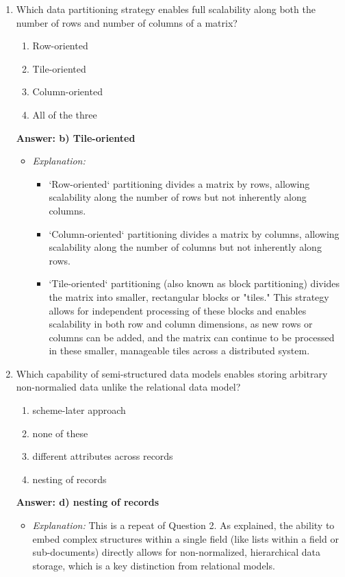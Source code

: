\documentclass{article}
\begin{document}
\begin{enumerate}[label=\textbf{Question \arabic*.}]
\item Which data partitioning strategy enables full scalability along both the number of rows and number of columns of a matrix?
    \begin{enumerate}[label=\alph*)]
        \item Row-oriented
        \item Tile-oriented
        \item Column-oriented
        \item All of the three
    \end{enumerate}
    \textbf{Answer: b) Tile-oriented}
    \begin{itemize}
        \item \textit{Explanation:}
        \begin{itemize}
            \item `Row-oriented` partitioning divides a matrix by rows, allowing scalability along the number of rows but not inherently along columns.
            \item `Column-oriented` partitioning divides a matrix by columns, allowing scalability along the number of columns but not inherently along rows.
            \item `Tile-oriented` partitioning (also known as block partitioning) divides the matrix into smaller, rectangular blocks or "tiles." This strategy allows for independent processing of these blocks and enables scalability in both row and column dimensions, as new rows or columns can be added, and the matrix can continue to be processed in these smaller, manageable tiles across a distributed system.
        \end{itemize}
    \end{itemize}

\item Which capability of semi-structured data models enables storing arbitrary non-normalied data unlike the relational data model?
    \begin{enumerate}[label=\alph*)]
        \item scheme-later approach
        \item none of these
        \item different attributes across records
        \item nesting of records
    \end{enumerate}
    \textbf{Answer: d) nesting of records}
    \begin{itemize}
        \item \textit{Explanation:} This is a repeat of Question 2. As explained, the ability to embed complex structures within a single field (like lists within a field or sub-documents) directly allows for non-normalized, hierarchical data storage, which is a key distinction from relational models.
    \end{itemize}


\end{enumerate}
\end{document}
